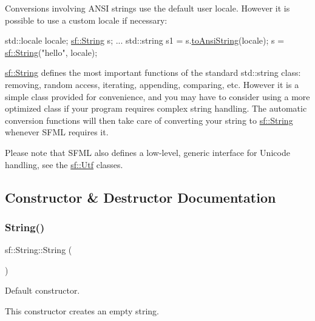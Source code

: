 Conversions involving A\+N\+SI strings use the default user locale. However it is possible to use a custom locale if necessary\+: 
\begin{DoxyCode}
std::locale locale;
\hyperlink{classsf_1_1_string}{sf::String} s;
...
std::string s1 = s.\hyperlink{classsf_1_1_string_ada5d5bba4528aceb0a1e298553e6c30a}{toAnsiString}(locale);
s = \hyperlink{classsf_1_1_string}{sf::String}(\textcolor{stringliteral}{"hello"}, locale);
\end{DoxyCode}


\hyperlink{classsf_1_1_string}{sf\+::\+String} defines the most important functions of the standard std\+::string class\+: removing, random access, iterating, appending, comparing, etc. However it is a simple class provided for convenience, and you may have to consider using a more optimized class if your program requires complex string handling. The automatic conversion functions will then take care of converting your string to \hyperlink{classsf_1_1_string}{sf\+::\+String} whenever S\+F\+ML requires it.

Please note that S\+F\+ML also defines a low-\/level, generic interface for Unicode handling, see the \hyperlink{classsf_1_1_utf}{sf\+::\+Utf} classes. 

\subsection{Constructor \& Destructor Documentation}
\mbox{\label{classsf_1_1_string_a9563a4e93f692e0c8e8702b374ef8692}} 
\subsubsection{\texorpdfstring{String()}{String()}\hspace{0.1cm}{\footnotesize\ttfamily [1/11]}}
{\footnotesize\ttfamily sf\+::\+String\+::\+String (\begin{DoxyParamCaption}{ }\end{DoxyParamCaption})}



Default constructor. 

This constructor creates an empty string. \mbox{\label{classsf_1_1_string_ac9df7f7696cff164794e338f3c89ccc5}} 
